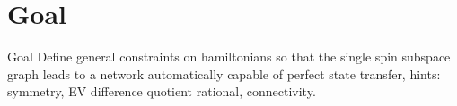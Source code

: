 \documentclass{beamer}
\begin{document}
\section{Goal}
\begin{frame}{Goal}
    Define general constraints on hamiltonians so that the single spin subspace graph leads to a network automatically capable of perfect state transfer, hints: symmetry, EV difference quotient rational, connectivity.
\end{frame}
\end{document}
